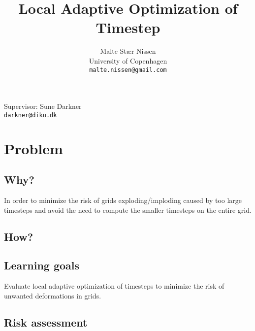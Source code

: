 \documentclass[11pt,a4paper]{article}
\title{Local Adaptive Optimization of Timestep}
\author{Malte Stær Nissen\\University of Copenhagen\\\texttt{malte.nissen@gmail.com}}
\begin{document}
\maketitle

Supervisor: Sune Darkner\\\texttt{darkner@diku.dk}

\section{Problem}

\subsection{Why?}
In order to minimize the risk of grids exploding/imploding caused by too large timesteps and avoid the need to compute the smaller timesteps on the entire grid.

\subsection{How?}

\subsection{Learning goals}
Evaluate local adaptive optimization of timesteps to minimize the risk of unwanted deformations in grids.

\subsection{Risk assessment}
\end{document}
